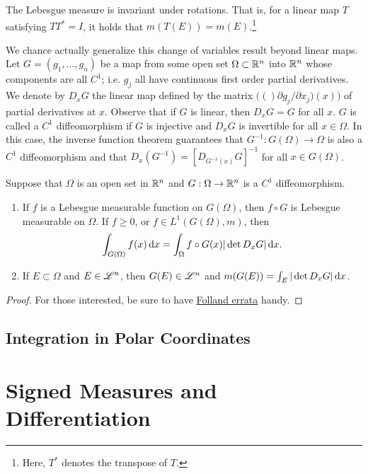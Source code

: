 \documentclass[12pt]{article} %
\begin{document}
\begin{corollary}
    The Lebesgue measure is invariant under rotations. That is, for a linear map $T$ satisfying $TT^* = I$, it holds that $m(T(E)) = m(E)$.\footnote{Here, $T^*$ denotes the transpose of $T$.}
\end{corollary}

We chance actually generalize this change of variables result beyond linear maps. Let $G = (g_1, \ldots, g_n)$ be a map from some open set $\Omega \subset \mathbb{R}^n$ into $\mathbb{R}^n$ whose components are all $C^1$; i.e. $g_j$ all have continuous first order partial derivatives. We denote by $D_x G$ the linear map defined by the matrix $\Big( ()\partial g_j / \partial x_j)(x) \Big)$ of partial derivatives at $x$. Observe that if $G$ is linear, then $D_x G = G$ for all $x$. $G$ is called a $C^1$ diffeomorphism if $G$ is injective and $D_x G$ is invertible for all $x \in \Omega$. In this case, the inverse function theorem guarantees that $G^{-1} : G(\Omega) \to \Omega$ is also a $C^1$ diffeomorphism and that $D_x(G^{-1}) = [D_{G^{-1}(x)}G]^{-1}$ for all $x \in G(\Omega)$.

\begin{theorem}
    Suppose that $\Omega$ is an open set in $\mathbb{R}^n$ and $G : \Omega \to \mathbb{R}^n$ is a $C^1$ diffeomorphism. \begin{enumerate}
        \item If $f$ is a Lebesgue measurable function on $G(\Omega)$, then $f \circ G$ is Lebesgue measurable on $\Omega$. If $f \geq 0$, or $f \in L^1(G(\Omega), m)$, then \[\int_{G(\Omega)} f(x)\, \mathrm{d} x = \int_{\Omega} f \circ G(x) | \det D_x G| \, \mathrm{d} x.\]
        \item If $E \subset \Omega$ and $E \in \mathscr{L}^n$, then $G(E) \in \mathscr{L}^n$ and $m(G(E)) = \int_E |\det D_x G| \, \mathrm{d} x$.
    \end{enumerate}
\end{theorem}

\begin{proof}
    For those interested, be sure to have \href{https://sites.math.washington.edu//~folland/Homepage/oldreals.pdf}{Folland errata} handy.
\end{proof}

\subsection{Integration in Polar Coordinates}


\section{Signed Measures and Differentiation}
\end{document}
